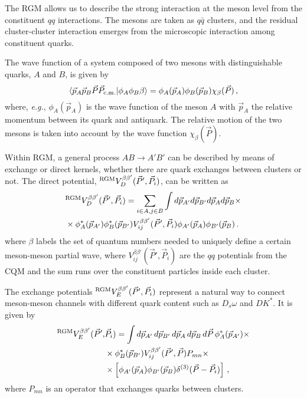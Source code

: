 \documentclass[aps, prd, floatfix, twocolumn, superscriptaddress, nofootinbib]{revtex4-1}
\begin{document}
The RGM allows us to describe the strong interaction at the meson level from the constituent $qq$ interactions. The mesons are taken as $q\bar q$ clusters, and the
residual cluster-cluster interaction emerges from the microscopic interaction among constituent quarks.

The wave function of a system composed of two mesons with distinguishable quarks, $A$ and $B$, is given by
\begin{equation}
\langle \vec{p}_{A} \vec{p}_{B} \vec{P} \vec{P}_{\rm c.m.} | \phi_A \phi_B \beta
\rangle = \phi_{A}(\vec{p}_{A}) \phi_{B}(\vec{p}_{B})
\chi_{\beta}(\vec{P}) \,,
\label{eq:wf}
\end{equation}
where, \emph{e.g.}, $\phi_{A}(\vec{p}_{A})$ is the wave function of the meson $A$ with $\vec{p}_{A}$ the relative momentum between its quark and antiquark. The relative motion of the two mesons is taken into account by the wave function $\chi_\beta(\vec{P})$.

Within RGM, a general process $AB\to A'B'$ can be described by means of exchange or direct kernels, whether there are quark exchanges between clusters or not. The direct potential, ${}^{\rm RGM}V_{D}^{\beta\beta '}(\vec{P}',\vec{P}_{i})$, can be written as
\begin{align}
&
{}^{\rm RGM}V_{D}^{\beta\beta '}(\vec{P}',\vec{P}_{i}) = \sum_{i\in A, j\in B} \int d\vec{p}_{A'} d\vec{p}_{B'} d\vec{p}_{A} d\vec{p}_{B} \times \nonumber \\
&
\times \phi_{A}^{\ast}(\vec{p}_{A'}) \phi_{B}^{\ast}(\vec{p}_{B'})
V_{ij}^{\beta\beta '}(\vec{P}',\vec{P}_{i}) \phi_{A'}(\vec{p}_{A}) \phi_{B'}(\vec{p}_{B})  \,.
\label{eq:RGMdir}
\end{align}
where $\beta$ labels the set of quantum numbers needed to uniquely define a certain meson-meson partial wave,
where $V_{ij}^{\beta\beta '}(\vec{P}',\vec{P}_{i})$ are the $qq$ potentials from the CQM and the sum runs over the constituent particles inside each cluster.

The exchange potentials ${}^{\rm RGM}V_{E}^{\beta\beta'}(\vec{P}',\vec{P}_{i})$ represent a natural way to connect meson-meson channels with different quark content such as $D_s\omega$ and $DK^\ast$. It is given by
\begin{align}
{}^{\rm RGM}V_{E}^{\beta\beta'}(\vec{P}',&\vec{P}_{i}) = \int d\vec{p}_{A'}\,
d\vec{p}_{B'}\, d\vec{p}_{A}\, d\vec{p}_{B}\, d\vec{P}\, \phi_{A}^{\ast}(\vec{p}_{A'}) \times \nonumber \\
&
\times  \phi_{B}^{\ast}(\vec{p}_{B'})
V_{ij}^{\beta\beta '}(\vec{P}',\vec{P}) P_{mn} \times \nonumber \\
&
\times \left[\phi_{A'}(\vec{p}_{A}) \phi_{B'}(\vec{p}_{B}) \delta^{(3)}(\vec{P}-\vec{P}_{i}) \right] \,,
\label{eq:RGMexc}
\end{align}
where $P_{mn}$ is an operator that exchanges quarks between clusters.
\end{document}
